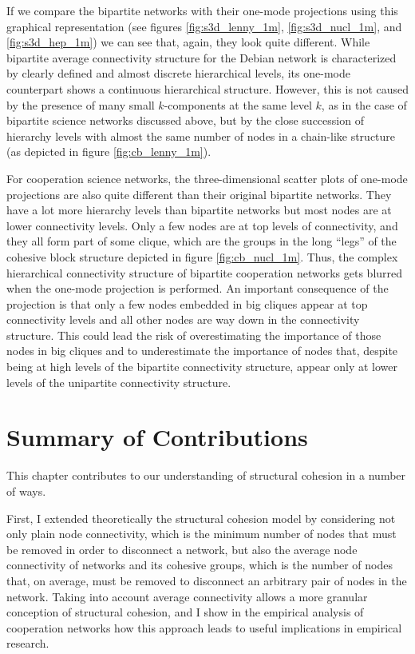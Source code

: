 If we compare the bipartite networks with their one-mode projections using this graphical representation (see figures \ref{fig:s3d_lenny_1m}, \ref{fig:s3d_nucl_1m}, and \ref{fig:s3d_hep_1m}) we can see that, again, they look quite different. While bipartite average connectivity structure for the Debian network is characterized by clearly defined and almost discrete hierarchical levels, its one-mode counterpart shows a continuous hierarchical structure. However, this is not caused by the presence of many small $k$-components at the same level $k$, as in the case of bipartite science networks discussed above, but by the close succession of hierarchy levels with almost the same number of nodes in a chain-like structure (as depicted in figure \ref{fig:cb_lenny_1m}).

For cooperation science networks, the three-dimensional scatter plots of one-mode projections are also quite different than their original bipartite networks. They have a lot more hierarchy levels than bipartite networks but most nodes are at lower connectivity levels. Only a few nodes are at top levels of connectivity, and they all form part of some clique, which are the groups in the long ``legs'' of the cohesive block structure depicted in figure \ref{fig:cb_nucl_1m}. Thus, the complex hierarchical connectivity structure of bipartite cooperation networks gets blurred when the one-mode projection is performed. An important consequence of the projection is that only a few nodes embedded in big cliques appear at top connectivity levels and all other nodes are way down in the connectivity structure. This could lead the risk of overestimating the importance of those nodes in big cliques and to underestimate the importance of nodes that, despite being at high levels of the bipartite connectivity structure, appear only at lower levels of the unipartite connectivity structure.

\section{Summary of Contributions}

This chapter contributes to our understanding of structural cohesion in a number of ways.

First, I extended theoretically the structural cohesion model by considering not only plain node connectivity, which is the minimum number of nodes that must be removed in order to disconnect a network, but also the average node connectivity of networks and its cohesive groups, which is the number of nodes that, on average, must be removed to disconnect an arbitrary pair of nodes in the network. Taking into account average connectivity allows a more granular conception of structural cohesion, and I show in the empirical analysis of cooperation networks how this approach leads to useful implications in empirical research.

